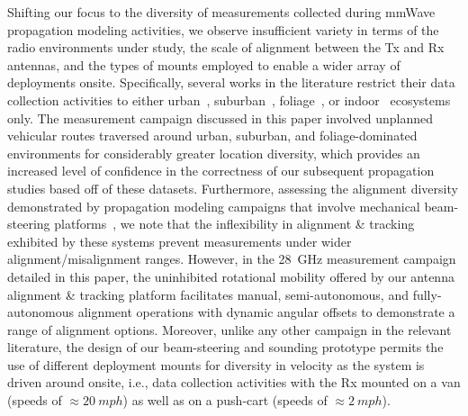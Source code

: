 \documentclass[12pt, draftcls, onecolumn]{IEEEtran}
\begin{document}
Shifting our focus to the diversity of measurements collected during mmWave propagation modeling activities, we observe insufficient variety in terms of the radio environments under study, the scale of alignment between the Tx and Rx antennas, and the types of mounts employed to enable a wider array of deployments onsite. Specifically, several works in the literature restrict their data collection activities to either urban~\cite{Outdoor28G, PDAPs, QDC_NIST, DopplerHST, V2XBlockages, MacCartneyUrbanHumanBlockage}, suburban~\cite{Purdue, SuburbanGeometryJournal}, foliage~\cite{Foliage, FoliageSimulations}, or indoor~\cite{AgileLink, Harvard, SpatialConsistencyOriginal, SpatialDynamics, Indoor60G, D2DHumanBlockage} ecosystems only. The measurement campaign discussed in this paper involved unplanned vehicular routes traversed around urban, suburban, and foliage-dominated environments for considerably greater location diversity, which provides an increased level of confidence in the correctness of our subsequent propagation studies based off of these datasets. Furthermore, assessing the alignment diversity demonstrated by propagation modeling campaigns that involve mechanical beam-steering platforms~\cite{Purdue, Harvard, SpatialConsistencyOriginal, SpatialDynamics, SuburbanGeometryJournal, Outdoor28G, QDC_NIST, D2DHumanBlockage, MacCartneyUrbanHumanBlockage}, we note that the inflexibility in alignment \& tracking exhibited by these systems prevent measurements under wider alignment/misalignment ranges. However, in the \SI{28}{\giga\hertz} measurement campaign detailed in this paper, the uninhibited rotational mobility offered by our antenna alignment \& tracking platform facilitates manual, semi-autonomous, and fully-autonomous alignment operations with dynamic angular offsets to demonstrate a range of alignment options. Moreover, unlike any other campaign in the relevant literature, the design of our beam-steering and sounding prototype permits the use of different deployment mounts for diversity in velocity as the system is driven around onsite, i.e., data collection activities with the Rx mounted on a van (speeds of ${\approx}\SI{20}{mph}$) as well as on a push-cart (speeds of ${\approx}\SI{2}{mph}$).
\end{document}
